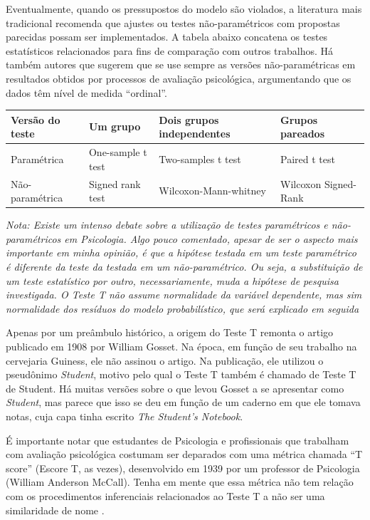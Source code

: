 \documentclass[
]{book}
\begin{document}
Eventualmente, quando os pressupostos do modelo são violados, a literatura mais tradicional recomenda que ajustes ou testes não-paramétricos com propostas parecidas possam ser implementados. A tabela abaixo concatena os testes estatísticos relacionados para fins de comparação com outros trabalhos. Há também autores que sugerem que se use sempre as versões não-paramétricas em resultados obtidos por processos de avaliação psicológica, argumentando que os dados têm nível de medida ``ordinal''.

\begin{longtable}[]{@{}llll@{}}
\toprule
Versão do teste & Um grupo & Dois grupos independentes & Grupos pareados\tabularnewline
\midrule
\endhead
Paramétrica & One-sample t test & Two-samples t test & Paired t test\tabularnewline
Não-paramétrica & Signed rank test & Wilcoxon-Mann-whitney & Wilcoxon Signed-Rank\tabularnewline
\bottomrule
\end{longtable}

\emph{Nota: Existe um intenso debate sobre a utilização de testes paramétricos e não-paramétricos em Psicologia. Algo pouco comentado, apesar de ser o aspecto mais importante em minha opinião, é que a hipótese testada em um teste paramétrico é diferente da teste da testada em um não-paramétrico. Ou seja, a substituição de um teste estatístico por outro, necessariamente, muda a hipótese de pesquisa investigada. O Teste T não assume normalidade da variável dependente, mas sim normalidade dos resíduos do modelo probabilístico, que será explicado em seguida}

Apenas por um preâmbulo histórico, a origem do Teste T remonta o artigo publicado em 1908 por William Gosset. Na época, em função de seu trabalho na cervejaria Guiness, ele não assinou o artigo. Na publicação, ele utilizou o pseudônimo \emph{Student}, motivo pelo qual o Teste T também é chamado de Teste T de Student. Há muitas versões sobre o que levou Gosset a se apresentar como \emph{Student}, mas parece que isso se deu em função de um caderno em que ele tomava notas, cuja capa tinha escrito \emph{The Student's Notebook}.

É importante notar que estudantes de Psicologia e profissionais que trabalham com avaliação psicológica costumam ser deparados com uma métrica chamada ``T score'' (Escore T, as vezes), desenvolvido em 1939 por um professor de Psicologia (William Anderson McCall). Tenha em mente que essa métrica não tem relação com os procedimentos inferenciais relacionados ao Teste T a não ser uma similaridade de nome \citep{Krus1977}.
\end{document}
